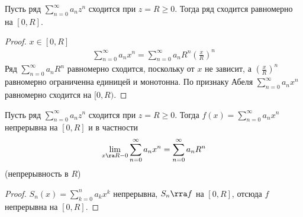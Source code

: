 \begin{theorem}[Абеля]
	Пусть ряд $\sum_{n=0}^\infty a_n z^n$ сходится при $z = R \ge 0$.
	Тогда ряд сходится равномерно на $[0, R]$.
\end{theorem}
\begin{proof}
	$x \in [0, R]$
	\begin{gather*}
		\sum_{n=0}^\infty a_n x^n
		= \sum_{n=0}^\infty a_n R^n \left(\frac xR\right)^n
	\end{gather*}
	Ряд $\sum_{n=0}^\infty a_n R^n$ равномерно сходится, поскольку от $x$ не зависит,
	а $\left(\frac xR\right)^n$ равномерно ограниченна единицей и монотонна.
	По признаку Абеля $\sum_{n=0}^\infty a_n x^n$ равномерно сходится на $[0, R)$.
\end{proof}

\begin{conseq}
	Пусть ряд $\sum_{n=0}^\infty a_n z^n$ сходится при $z = R \ge 0$.
	Тогда $f(x) = \sum_{n=0}^\infty a_n x^n$ непрерывна на $[0, R]$
	и в частности
	\[ \lim_{x \ra R-0} \sum_{n=0}^\infty a_n x^n = \sum_{n=0}^\infty a_n R^n \]
	(непрерывность в $R$)
\end{conseq}
\begin{proof}
	$S_n(x) = \sum_{k=0}^n a_k x^k$ непрерывна, $S_n \rra f$ на $[0, R]$, отсюда $f$ непрерывна на $[0, R]$.
\end{proof}

